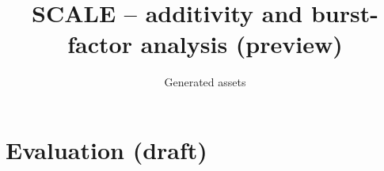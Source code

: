 \documentclass[runningheads]{llncs}
\begin{document}
\title{SCALE -- additivity and burst-factor analysis (preview)}
\author{Generated assets}
\maketitle
\section{Evaluation (draft)}

\end{document}
